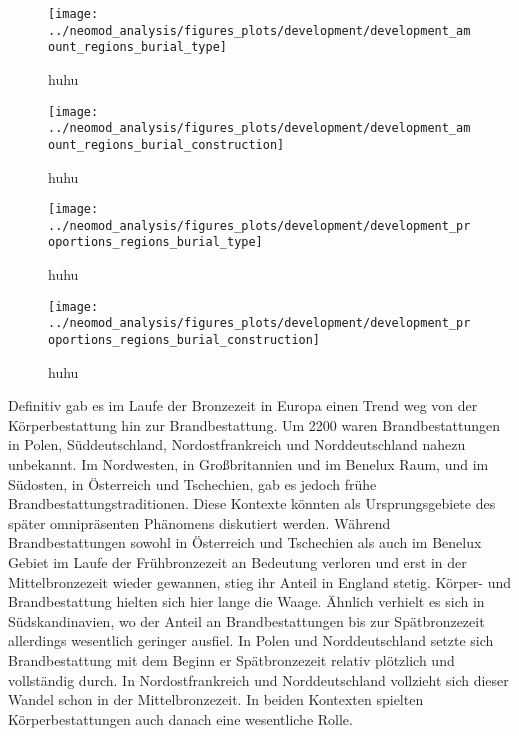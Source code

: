\documentclass[openany,twoside,twocolumn]{book}
\begin{document}
\begin{figure}
\texttt{[image: ../neomod\_analysis/figures\_plots/development/development\_amount\_regions\_burial\_type]} \caption[huhu]{huhu}\label{fig:development-amount-regions-burial-type}
\end{figure}

\begin{figure}
\texttt{[image: ../neomod\_analysis/figures\_plots/development/development\_amount\_regions\_burial\_construction]} \caption[huhu]{huhu}\label{fig:development-amount-regions-burial-construction}
\end{figure}

\begin{figure}
\texttt{[image: ../neomod\_analysis/figures\_plots/development/development\_proportions\_regions\_burial\_type]} \caption[huhu]{huhu}\label{fig:development-proportions-regions-burial-type}
\end{figure}

\begin{figure}
\texttt{[image: ../neomod\_analysis/figures\_plots/development/development\_proportions\_regions\_burial\_construction]} \caption[huhu]{huhu}\label{fig:development-proportions-regions-burial-construction}
\end{figure}

Definitiv gab es im Laufe der Bronzezeit in Europa einen Trend weg von
der Körperbestattung hin zur Brandbestattung. Um 2200 waren
Brandbestattungen in Polen, Süddeutschland, Nordostfrankreich und
Norddeutschland nahezu unbekannt. Im Nordwesten, in Großbritannien und
im Benelux Raum, und im Südosten, in Österreich und Tschechien, gab es
jedoch frühe Brandbestattungstraditionen. Diese Kontexte könnten als
Ursprungsgebiete des später omnipräsenten Phänomens diskutiert werden.
Während Brandbestattungen sowohl in Österreich und Tschechien als auch
im Benelux Gebiet im Laufe der Frühbronzezeit an Bedeutung verloren und
erst in der Mittelbronzezeit wieder gewannen, stieg ihr Anteil in
England stetig. Körper- und Brandbestattung hielten sich hier lange die
Waage. Ähnlich verhielt es sich in Südskandinavien, wo der Anteil an
Brandbestattungen bis zur Spätbronzezeit allerdings wesentlich geringer
ausfiel. In Polen und Norddeutschland setzte sich Brandbestattung mit
dem Beginn er Spätbronzezeit relativ plötzlich und vollständig durch. In
Nordostfrankreich und Norddeutschland vollzieht sich dieser Wandel schon
in der Mittelbronzezeit. In beiden Kontexten spielten Körperbestattungen
auch danach eine wesentliche Rolle.
\end{document}
